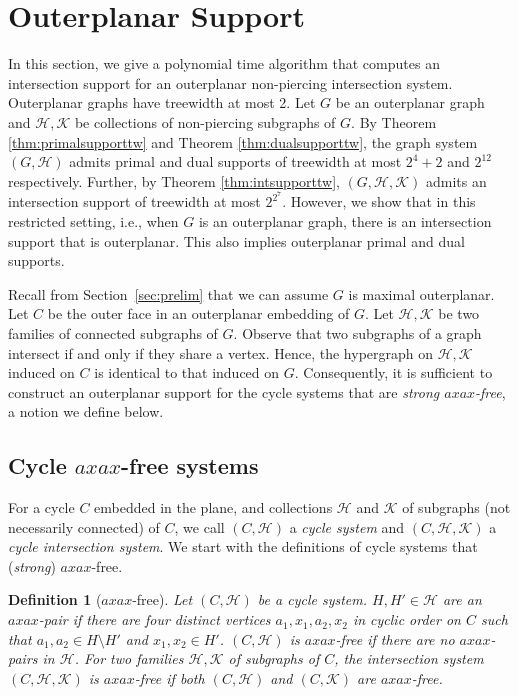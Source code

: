 \documentclass[12pt]{article}
\newcommand{\HH}{\mathcal{H}}
\newcommand{\KK}{\mathcal{K}}
\newtheorem{definition}[theorem]{Definition}
\theoremstyle{case}
\begin{document}
\section{Outerplanar Support}\label{sec:outerplanar}
In this section, we give a polynomial time algorithm
that computes an intersection support for an outerplanar non-piercing intersection system.
Outerplanar graphs have treewidth at most 2.
Let $G$ be an outerplanar graph and $\HH,\KK$ be collections of non-piercing subgraphs of $G$.
By Theorem \ref{thm:primalsupporttw} and Theorem \ref{thm:dualsupporttw}, the graph system $(G,\HH)$ admits primal and dual supports of treewidth at most $2^{4}+2$ and $2^{12}$ respectively.
Further, by Theorem \ref{thm:intsupporttw}, $(G,\HH,\KK)$ admits an intersection support of treewidth at most $2^{2^7}$.
However, we show that in this restricted setting, i.e., when $G$ is an outerplanar graph, there is an intersection support that is outerplanar.
This also implies outerplanar primal and dual supports.

Recall from Section~\ref{sec:prelim} that we can assume $G$ is maximal outerplanar. 
Let $C$ be the outer face in an outerplanar embedding of $G$.
Let $\HH,\KK$ be two families of connected subgraphs of $G$.
Observe that two subgraphs of a graph intersect if and only if they share a vertex. Hence, the hypergraph on $\mathcal{H},\mathcal{K}$ induced on $C$ is identical to that induced on $G$.
Consequently, it is sufficient to construct an outerplanar support for the cycle systems that are \emph{strong $axax$-free}, a
notion we define below.

\subsection{Cycle $axax$-free systems}\label{sec:cycleaxax}

For a cycle $C$ embedded in the plane, and collections $\HH$ and $\KK$ of subgraphs (not necessarily connected) of $C$, we call $(C,\HH)$ a \emph{cycle system} and $(C,\HH,\KK)$ a \emph{cycle intersection system}.
We start with the definitions of cycle systems that 
(\emph{strong}) $axax$-free.

\begin{definition}[$axax$-free]
\label{defn:axax}
Let $(C,\mathcal{H})$ be a cycle system.
$H,H'\in\mathcal{H}$ are an $axax$-pair if there are four distinct vertices 
$a_1,x_1,a_2,x_2$ in cyclic order on $C$ such that $a_1,a_2\in H\setminus H'$ and $x_1,x_2\in H'$.
$(C,\mathcal{H})$ is $axax$-free if there are no $axax$-pairs in $\mathcal{H}$.
For two families $\HH,\KK$ of subgraphs of $C$, the intersection system $(C,\mathcal{H},\mathcal{K})$ is \emph{$axax$-free} if both $(C,\mathcal{H})$ and $(C,\mathcal{K})$ are $axax$-free.
\end{definition}
\end{document}
